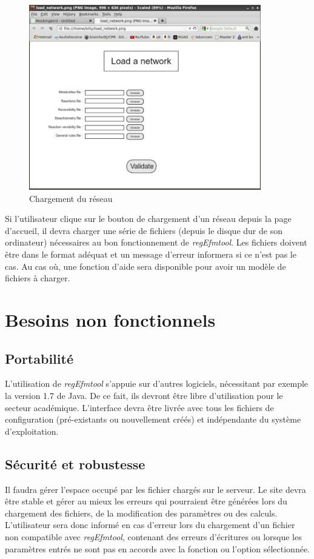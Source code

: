 \begin{figure}[!ht]
	\begin{center}
  		\includegraphics[width=0.90\textwidth]{load_firefox.png}  
  		\caption{Chargement du réseau}
  		\label{chargement}
	\end{center}
\end{figure}

Si l'utilisateur clique sur le bouton de chargement d'un réseau depuis la page d'accueil, il devra charger une série de fichiers (depuis le disque dur de son ordinateur) nécessaires au bon fonctionnement de \textit{regEfmtool}. Les fichiers doivent être dans le format adéquat et un message d'erreur informera si ce n'est pas le cas. Au cas où, une fonction d'aide sera disponible pour avoir un modèle de fichiers à charger. 

\section{Besoins non fonctionnels}

\subsection{Portabilité}
L'utilisation de \textit{regEfmtool} s'appuie sur d'autres logiciels, nécessitant par exemple la version 1.7 de Java. De ce fait, ils devront être libre d'utilisation pour le secteur académique. L'interface devra être livrée avec tous les fichiers de configuration (pré-existants ou nouvellement créés) et indépendante du système d'exploitation. 

\subsection{Sécurité et robustesse}
Il faudra gérer l'espace occupé par les fichier chargés sur le serveur. Le site devra être stable et gérer au mieux les erreurs qui pourraient être générées lors du chargement des fichiers, de la modification des paramètres ou des calculs. L'utilisateur sera donc informé en cas d'erreur lors du chargement d'un fichier non compatible avec \textit{regEfmtool}, contenant des erreurs d'écritures ou lorsque les paramètres entrés ne sont pas en accords avec la fonction ou l'option sélectionnée. 

